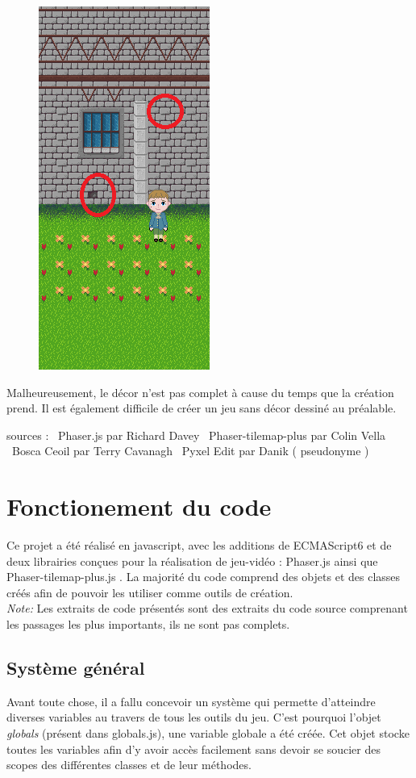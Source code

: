 \documentclass[11pt]{article}
\begin{document}
\begin{figure}[H]
\includegraphics{chateau}
\centering
\end{figure}

Malheureusement, le décor n'est pas complet à cause du temps que la création prend. Il est également difficile de créer un jeu sans décor dessiné au préalable.

sources : \
Phaser.js par Richard Davey \
Phaser-tilemap-plus par Colin Vella \
Bosca Ceoil par Terry Cavanagh \
Pyxel Edit par Danik ( pseudonyme )\


\section{Fonctionement du code}
Ce projet a été réalisé en javascript, avec les additions de ECMAScript6 et de deux librairies conçues pour la réalisation de jeu-vidéo : Phaser.js ainsi que Phaser-tilemap-plus.js . La majorité du code comprend des objets et des classes créés afin de pouvoir les utiliser comme outils de création.\\

\textit{Note:} Les extraits de code présentés sont des extraits du code source comprenant les passages les plus importants, ils ne sont pas complets.

\subsection{Système général}
	Avant toute chose, il a fallu concevoir un système qui permette d'atteindre diverses variables au travers de tous les outils du jeu. C'est pourquoi l'objet \textit{globals} (présent dans globals.js), une variable globale a été créée. Cet objet stocke toutes les variables afin d'y avoir accès facilement sans devoir se soucier des scopes des différentes classes et de leur méthodes.\\
	
\end{document}
